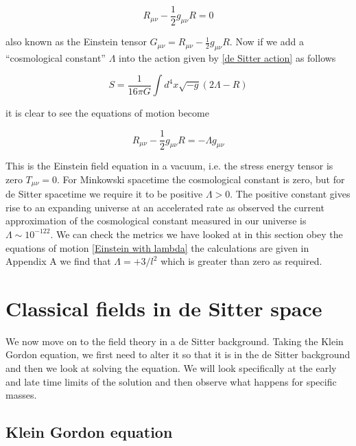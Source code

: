 \documentclass[a4paper,11pt]{article}
\numberwithin{equation}{section}
\numberwithin{figure}{section}
\begin{document}
\begin{large}
\begin{equation}
\label{Einstein tensor}
    R_{\mu \nu}-\frac{1}{2}g_{\mu \nu} R=0
\end{equation}

also known as the Einstein tensor $G_{\mu \nu}= R_{\mu \nu}-\frac{1}{2}g_{\mu \nu} R$. Now if we add a ``cosmological constant'' $\Lambda$ into the action given by \eqref{de Sitter action} as follows

\begin{equation}
\label{new action}
    S=\frac{1}{16\pi G} \int d^4x \sqrt{-g} (2\Lambda-R)
\end{equation}

it is clear to see the equations of motion become

\begin{equation}
\label{Einstein with lambda}
    R_{\mu \nu}-\frac{1}{2}g_{\mu \nu} R=-\Lambda g_{\mu \nu}
\end{equation}

This is the Einstein field equation in a vacuum, i.e. the stress energy tensor is zero $T_{\mu \nu}=0$. For Minkowski spacetime the cosmological constant is zero, but for de Sitter spacetime we require it to be positive $\Lambda>0$. The positive constant gives rise to an expanding universe at an accelerated rate as observed \cite{cosmoconst,cosmoval} the current approximation of the cosmological constant measured in our universe is $\Lambda \sim 10^{-122}$. We can check the metrics we have looked at in this section obey the equations of motion \eqref{Einstein with lambda} the calculations are given in Appendix A we find that $\Lambda=+3/l^2$ which is greater than zero as required.

\newpage

\section{Classical fields in de Sitter space}

We now move on to the field theory in a de Sitter background. Taking the Klein Gordon equation, we first need to alter it so that it is in the de Sitter background and then we look at solving the equation. We will look specifically at the early and late time limits of the solution and then observe what happens for specific masses.


\subsection{Klein Gordon equation}


\end{large}
\end{document}
